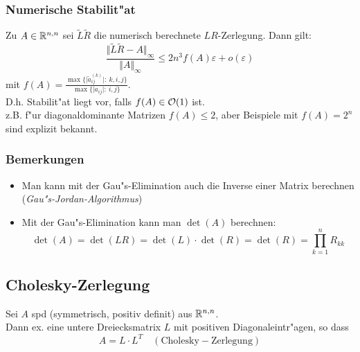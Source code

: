 \documentclass{scrartcl}
\begin{document}
\subsubsection{Numerische Stabilit"at}

\begin{Satz}
Zu $A \in \mathbb{R}^{n,n}$ sei $\tilde L \tilde R$ die numerisch berechnete $LR$-Zerlegung. Dann gilt:
$$ \frac{ \Vert \tilde L \tilde R - A \Vert_{\infty}}{\Vert A \Vert_{\infty}} \leq 2 n^3 f(A) \varepsilon + o(\varepsilon)$$
mit $\displaystyle f(A) = \frac{ \max \{ \vert \tilde a_{ij}^{(k)}  \vert : \ k,i,j \} }{ \max \{ \vert a_{ij} \vert : \ i,j \} }$. \\
D.h. Stabilit"at liegt vor, falls $f(A) \in \mathcal{O}(1)$ ist. \\
z.B. f"ur diagonaldominante Matrizen $f(A) \leq 2$, aber Beispiele mit $f(A) = 2^n$ sind explizit bekannt.
\end{Satz}

\subsubsection{Bemerkungen}

\begin{itemize}
\item Man kann mit der Gau"s-Elimination auch die Inverse einer Matrix berechnen (\emph{Gau"s-Jordan-Algorithmus}) 
\item Mit der Gau"s-Elimination kann man $\det(A)$ berechnen:
$$\det(A) = \det(LR) = \det(L) \cdot \det(R) = \det(R) = \prod\limits_{k=1}^n R_{kk} $$
\end{itemize}

\subsection{Cholesky-Zerlegung}

\begin{Satz}
Sei $A$ spd (symmetrisch, positiv definit) aus $\mathbb{R}^{n,n}$. \\
Dann ex. eine untere Dreiecksmatrix $L$ mit positiven Diagonaleintr"agen, so dass 
$$ A = L \cdot L^T \quad (\mathrm{Cholesky-Zerlegung})$$
\end{Satz}
\end{document}
